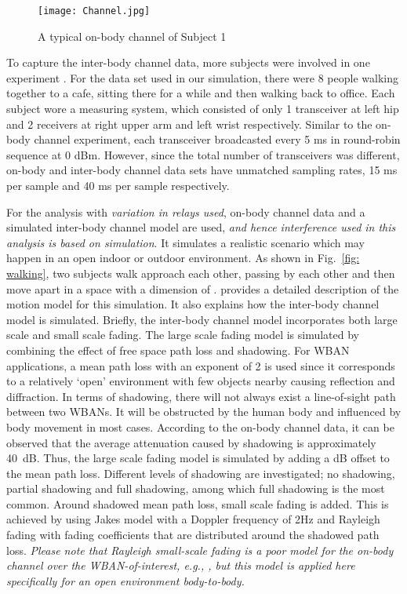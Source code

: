 \documentclass[12pt,draftcls,a4paper,onecolumn,journal]{IEEEtran}
\begin{document}
\begin{figure}[]
\centering
\texttt{[image: Channel.jpg]}
\caption{A typical on-body channel of Subject 1}
\label{fig: channel_s1}
\end{figure}

To capture the inter-body channel data, more subjects were involved in one experiment \cite{NICTAdata,Dong:ICC:2013}. For the data set used in our simulation, there were 8 people walking together to a cafe, sitting there for a while and then walking back to office. Each subject wore a measuring system, which consisted of only 1 transceiver at left hip and 2 receivers at right upper arm and left wrist respectively. Similar to the on-body channel experiment, each transceiver broadcasted every 5 ms in round-robin sequence at 0 dBm. However, since the total number of transceivers was different, on-body and inter-body channel data sets have unmatched sampling rates, 15 ms per sample and 40 ms per sample respectively.

For the analysis with \emph{variation in relays used}, on-body channel data and a simulated inter-body channel model are used, \emph{and hence interference used in this analysis is based on simulation}. It simulates a realistic scenario which may happen in an open indoor or outdoor environment. As shown in Fig.~\ref{fig: walking}, two subjects walk approach each other, passing by each other and then move apart in a space with a dimension of . \cite{Dong2012} provides a detailed description of the motion model for this simulation. It also explains how the inter-body channel model is simulated. Briefly, the inter-body channel model incorporates both large scale and small scale fading. The large scale fading model is simulated by combining the effect of free space path loss and shadowing. For WBAN applications, a mean path loss with an exponent of 2 is used since it corresponds to a relatively `open' environment with few objects nearby causing reflection and diffraction. In terms of shadowing, there will not always exist a line-of-sight path between two WBANs. It will be obstructed by the human body and influenced by body movement in most cases. According to the on-body channel data, it can be observed that the average attenuation caused by shadowing is approximately 40~dB. Thus, the large scale fading model is simulated by adding a  dB offset to the mean path loss. Different levels of shadowing are investigated; no shadowing, partial shadowing and full shadowing, among which full shadowing is the most common. Around shadowed mean path loss, small scale fading is added. This is achieved by using Jakes model with a Doppler frequency of 2Hz and Rayleigh fading with fading coefficients that are  distributed around the shadowed path loss. \emph{Please note that Rayleigh small-scale fading is a poor model for the on-body channel over the WBAN-of-interest, e.g., \cite{SmithIS08,Smith:AT:2011}, but this model is applied here specifically for an open environment body-to-body.}
\end{document}
